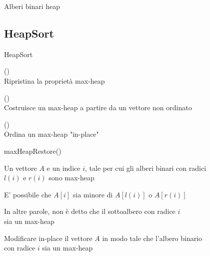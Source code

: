 \begin{frame}{Alberi binari heap}


\end{frame}

\subsection{HeapSort}

\begin{frame}{HeapSort}

\BIL
\item \alert{\maxheapify()}\\ Ripristina la proprietà max-heap
\item \alert{\heapbuild()}\\ Costruisce un max-heap a partire da un vettore non ordinato 
\item \alert{\heapsort()}\\ Ordina un max-heap "in-place"
\EIL

\end{frame}

\begin{frame}{maxHeapRestore()}

\begin{myboxtitle}[Input]
Un vettore $A$ e un indice $i$, tale per cui gli alberi binari
con radici\\ $l(i)$ e $r(i)$ sono max-heap
\end{myboxtitle}

\medskip
\begin{myboxtitle}[Osservazione]
\BI
\item E' possibile che $A[i]$ sia minore di $A[l(i)]$ o $A[r(i)]$
\item In altre parole, non è detto che il sottoalbero con radice $i$\\ sia
un max-heap
\EI
\end{myboxtitle}

\medskip
\begin{myboxtitle}[Goal]
Modificare in-place il vettore $A$ in modo tale che l'albero binario\\ con radice $i$
sia un max-heap
\end{myboxtitle}    
    
\end{frame}

